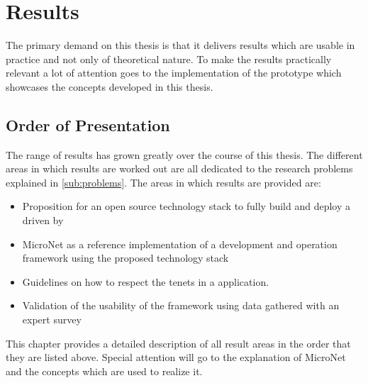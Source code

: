 \chapter{Results}

The primary demand on this thesis is that it delivers results which are
usable in practice and not only of theoretical nature. To make the results
practically relevant a lot of attention goes to the implementation of the
prototype which showcases the concepts developed in this thesis.

\section{Order of Presentation}

The range of results has grown greatly over the course of this thesis. The
different areas in which results are worked out are all dedicated to the
research problems explained in \autoref{sub:problems}. The areas in which
results are provided are:

\begin{itemize}
  \item Proposition for an  open source technology stack to fully build and
  deploy a \og{} driven by \mss{}
  \item MicroNet as a reference implementation of a \ms{} \og{} development and
  operation framework using the proposed technology stack
  \item Guidelines on how to respect the \ms{} tenets in a \og{} \ms{}
  application.
  \item Validation of the usability of the framework using data gathered with an
  expert survey 
\end{itemize}

This chapter provides a detailed description of all result areas in the order
that they are listed above. Special attention will go to the explanation of
MicroNet and the concepts which are used to realize it.

\newpage

\newpage

\newpage
